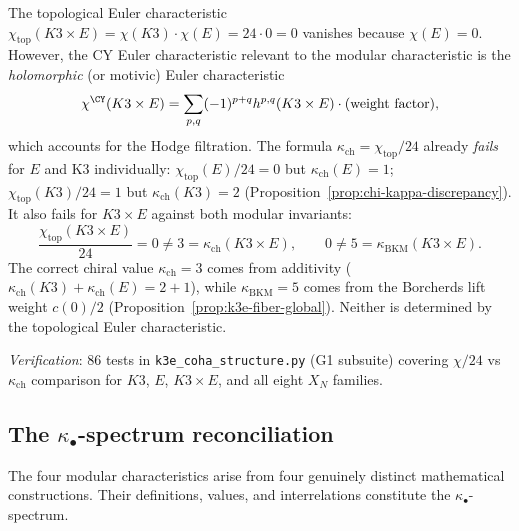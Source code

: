 \begin{warning}
\label{warn:k3e-chi-kappa}
The topological Euler characteristic $\chi_{\mathrm{top}}(K3 \times E) = \chi(K3) \cdot \chi(E) = 24 \cdot 0 = 0$ vanishes because $\chi(E) = 0$. However, the CY Euler characteristic relevant to the modular characteristic is the \emph{holomorphic} (or motivic) Euler characteristic
\[
 \chi^{\CY}(K3 \times E) = \sum_{p,q} (-1)^{p+q} h^{p,q}(K3 \times E) \cdot (\text{weight factor}),
\]
which accounts for the Hodge filtration. The formula $\kappa_{\mathrm{ch}} = \chi_{\mathrm{top}}/24$ already \emph{fails} for $E$ and K3 individually: $\chi_{\mathrm{top}}(E)/24 = 0$ but $\kappa_{\mathrm{ch}}(E) = 1$; $\chi_{\mathrm{top}}(K3)/24 = 1$ but $\kappa_{\mathrm{ch}}(K3) = 2$ (Proposition~\ref{prop:chi-kappa-discrepancy}). It also fails for $K3 \times E$ against both modular invariants:
\[
 \frac{\chi_{\mathrm{top}}(K3 \times E)}{24} = 0 \neq 3 = \kappa_{\mathrm{ch}}(K3 \times E), \qquad
 0 \neq 5 = \kappa_{\mathrm{BKM}}(K3 \times E).
\]
The correct chiral value $\kappa_{\mathrm{ch}} = 3$ comes from additivity ($\kappa_{\mathrm{ch}}(K3) + \kappa_{\mathrm{ch}}(E) = 2 + 1$), while $\kappa_{\mathrm{BKM}} = 5$ comes from the Borcherds lift weight $c(0)/2$ (Proposition~\ref{prop:k3e-fiber-global}). Neither is determined by the topological Euler characteristic.
\end{warning}

\noindent\textit{Verification}: 86 tests in \texttt{k3e\_coha\_structure.py} (G1 subsuite) covering $\chi/24$ vs $\kappa_{\mathrm{ch}}$ comparison for $K3$, $E$, $K3 \times E$, and all eight $X_N$ families.


\subsection{The $\kappa_\bullet$-spectrum reconciliation}
\label{subsec:kappa-spectrum-reconciliation}


The four modular characteristics arise from four genuinely distinct mathematical constructions.  Their definitions, values, and interrelations constitute the $\kappa_\bullet$-spectrum.

